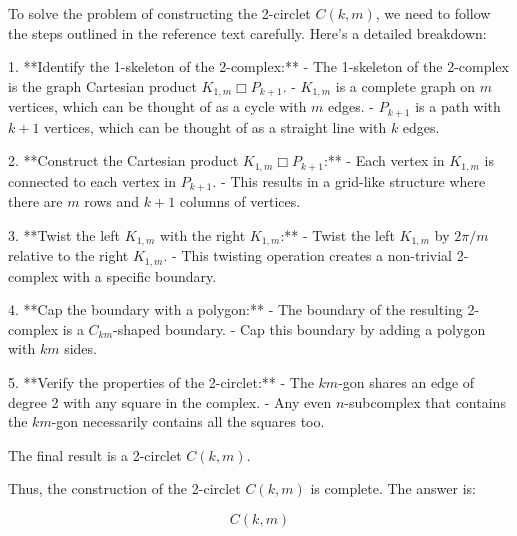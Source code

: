 To solve the problem of constructing the 2-circlet \( C(k, m) \), we need to follow the steps outlined in the reference text carefully. Here's a detailed breakdown:

1. **Identify the 1-skeleton of the 2-complex:**
   - The 1-skeleton of the 2-complex is the graph Cartesian product \( K_{1,m} \Box P_{k+1} \).
   - \( K_{1,m} \) is a complete graph on \( m \) vertices, which can be thought of as a cycle with \( m \) edges.
   - \( P_{k+1} \) is a path with \( k+1 \) vertices, which can be thought of as a straight line with \( k \) edges.

2. **Construct the Cartesian product \( K_{1,m} \Box P_{k+1} \):**
   - Each vertex in \( K_{1,m} \) is connected to each vertex in \( P_{k+1} \).
   - This results in a grid-like structure where there are \( m \) rows and \( k+1 \) columns of vertices.

3. **Twist the left \( K_{1,m} \) with the right \( K_{1,m} \):**
   - Twist the left \( K_{1,m} \) by \( 2\pi/m \) relative to the right \( K_{1,m} \).
   - This twisting operation creates a non-trivial 2-complex with a specific boundary.

4. **Cap the boundary with a polygon:**
   - The boundary of the resulting 2-complex is a \( C_{km} \)-shaped boundary.
   - Cap this boundary by adding a polygon with \( km \) sides.

5. **Verify the properties of the 2-circlet:**
   - The \( km \)-gon shares an edge of degree 2 with any square in the complex.
   - Any even \( n \)-subcomplex that contains the \( km \)-gon necessarily contains all the squares too.

The final result is a 2-circlet \( C(k, m) \).

Thus, the construction of the 2-circlet \( C(k, m) \) is complete. The answer is:

\[
\boxed{C(k, m)}
\]